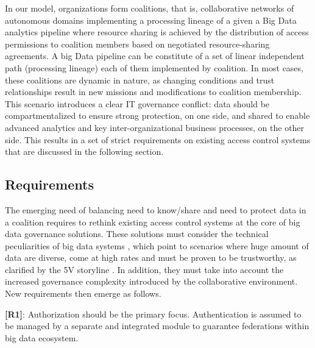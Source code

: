 In our model, organizations form coalitions, that is, collaborative networks of autonomous domains implementing a processing lineage of a given a Big Data analytics pipeline where resource sharing is achieved by the distribution of access permissions to coalition members based on negotiated resource-sharing agreements. A big Data pipeline can be constitute of a set of linear independent path (processing lineage) each of them implemented by coalition. In most cases, these coalitions are dynamic in nature, as changing conditions and trust relationships result in new missions and modifications to coalition membership. This scenario introduces a clear IT governance conflict: data should be compartmentalized to ensure strong protection, on one side, and shared to enable advanced analytics and key inter-organizational business processes, on the other side. This results in a set of strict requirements on existing access control systems that are discussed in the following section.


\subsection{Requirements}\label{sec:accesscontrol_req}

The emerging need of balancing need to know/share and need to protect data in a coalition requires to rethink existing access control systems at the core of big data governance solutions. These solutions must consider the technical peculiarities of big data systems \cite{al2018exploring,aissa2020decide}, which point to scenarios where huge amount of data are diverse, come at high rates and must be proven to be trustworthy, as clarified by the 5V storyline \cite{5v}. In addition, they must take into account the increased governance complexity introduced by the collaborative environment. New  requirements then emerge as follows.

\noindent \textbf{[R1]}: Authorization should be the primary focus. Authentication is assumed to be managed by a separate and integrated module to guarantee federations within big data ecosystem.

